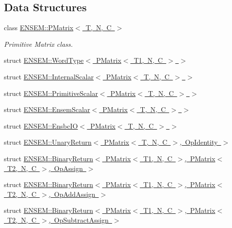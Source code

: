 \subsection*{Data Structures}
\begin{DoxyCompactItemize}
\item 
class \mbox{\hyperlink{classENSEM_1_1PMatrix}{E\+N\+S\+E\+M\+::\+P\+Matrix$<$ T, N, C $>$}}
\begin{DoxyCompactList}\small\item\em Primitive Matrix class. \end{DoxyCompactList}\item 
struct \mbox{\hyperlink{structENSEM_1_1WordType_3_01PMatrix_3_01T1_00_01N_00_01C_01_4_01_4}{E\+N\+S\+E\+M\+::\+Word\+Type$<$ P\+Matrix$<$ T1, N, C $>$ $>$}}
\item 
struct \mbox{\hyperlink{structENSEM_1_1InternalScalar_3_01PMatrix_3_01T_00_01N_00_01C_01_4_01_4}{E\+N\+S\+E\+M\+::\+Internal\+Scalar$<$ P\+Matrix$<$ T, N, C $>$ $>$}}
\item 
struct \mbox{\hyperlink{structENSEM_1_1PrimitiveScalar_3_01PMatrix_3_01T_00_01N_00_01C_01_4_01_4}{E\+N\+S\+E\+M\+::\+Primitive\+Scalar$<$ P\+Matrix$<$ T, N, C $>$ $>$}}
\item 
struct \mbox{\hyperlink{structENSEM_1_1EnsemScalar_3_01PMatrix_3_01T_00_01N_00_01C_01_4_01_4}{E\+N\+S\+E\+M\+::\+Ensem\+Scalar$<$ P\+Matrix$<$ T, N, C $>$ $>$}}
\item 
struct \mbox{\hyperlink{structENSEM_1_1EnsbcIO_3_01PMatrix_3_01T_00_01N_00_01C_01_4_01_4}{E\+N\+S\+E\+M\+::\+Ensbc\+I\+O$<$ P\+Matrix$<$ T, N, C $>$ $>$}}
\item 
struct \mbox{\hyperlink{structENSEM_1_1UnaryReturn_3_01PMatrix_3_01T_00_01N_00_01C_01_4_00_01OpIdentity_01_4}{E\+N\+S\+E\+M\+::\+Unary\+Return$<$ P\+Matrix$<$ T, N, C $>$, Op\+Identity $>$}}
\item 
struct \mbox{\hyperlink{structENSEM_1_1BinaryReturn_3_01PMatrix_3_01T1_00_01N_00_01C_01_4_00_01PMatrix_3_01T2_00_01N_00_01C_01_4_00_01OpAssign_01_4}{E\+N\+S\+E\+M\+::\+Binary\+Return$<$ P\+Matrix$<$ T1, N, C $>$, P\+Matrix$<$ T2, N, C $>$, Op\+Assign $>$}}
\item 
struct \mbox{\hyperlink{structENSEM_1_1BinaryReturn_3_01PMatrix_3_01T1_00_01N_00_01C_01_4_00_01PMatrix_3_01T2_00_01N_00_01C_01_4_00_01OpAddAssign_01_4}{E\+N\+S\+E\+M\+::\+Binary\+Return$<$ P\+Matrix$<$ T1, N, C $>$, P\+Matrix$<$ T2, N, C $>$, Op\+Add\+Assign $>$}}
\item 
struct \mbox{\hyperlink{structENSEM_1_1BinaryReturn_3_01PMatrix_3_01T1_00_01N_00_01C_01_4_00_01PMatrix_3_01T2_00_01N_00_6e0f512bc0c9bb8e39f94b0a604e2d32}{E\+N\+S\+E\+M\+::\+Binary\+Return$<$ P\+Matrix$<$ T1, N, C $>$, P\+Matrix$<$ T2, N, C $>$, Op\+Subtract\+Assign $>$}}

\end{DoxyCompactItemize}
